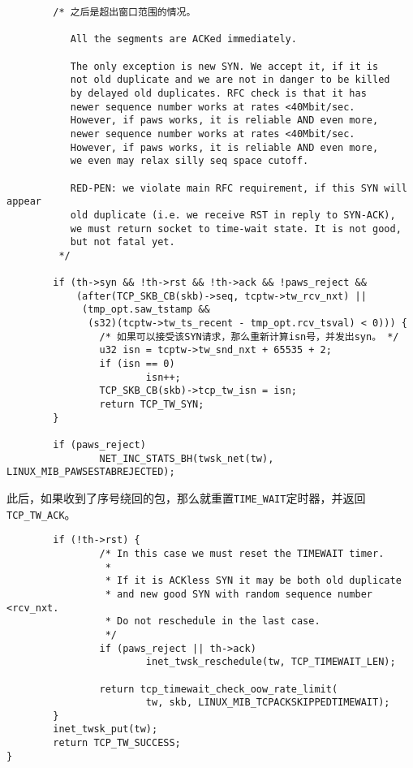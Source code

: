 \begin{verbatim}
        /* 之后是超出窗口范围的情况。

           All the segments are ACKed immediately.

           The only exception is new SYN. We accept it, if it is
           not old duplicate and we are not in danger to be killed
           by delayed old duplicates. RFC check is that it has
           newer sequence number works at rates <40Mbit/sec.
           However, if paws works, it is reliable AND even more,
           newer sequence number works at rates <40Mbit/sec.
           However, if paws works, it is reliable AND even more,
           we even may relax silly seq space cutoff.

           RED-PEN: we violate main RFC requirement, if this SYN will appear
           old duplicate (i.e. we receive RST in reply to SYN-ACK),
           we must return socket to time-wait state. It is not good,
           but not fatal yet.
         */

        if (th->syn && !th->rst && !th->ack && !paws_reject &&
            (after(TCP_SKB_CB(skb)->seq, tcptw->tw_rcv_nxt) ||
             (tmp_opt.saw_tstamp &&
              (s32)(tcptw->tw_ts_recent - tmp_opt.rcv_tsval) < 0))) {
                /* 如果可以接受该SYN请求，那么重新计算isn号，并发出syn。 */
                u32 isn = tcptw->tw_snd_nxt + 65535 + 2;
                if (isn == 0)
                        isn++;
                TCP_SKB_CB(skb)->tcp_tw_isn = isn;
                return TCP_TW_SYN;
        }

        if (paws_reject)
                NET_INC_STATS_BH(twsk_net(tw), LINUX_MIB_PAWSESTABREJECTED);
\end{verbatim}
此后，如果收到了序号绕回的包，那么就重置\texttt{TIME_WAIT}定时器，并返回
\texttt{TCP_TW_ACK}。
\begin{verbatim}
        if (!th->rst) {
                /* In this case we must reset the TIMEWAIT timer.
                 *
                 * If it is ACKless SYN it may be both old duplicate
                 * and new good SYN with random sequence number <rcv_nxt.
                 * Do not reschedule in the last case.
                 */
                if (paws_reject || th->ack)
                        inet_twsk_reschedule(tw, TCP_TIMEWAIT_LEN);

                return tcp_timewait_check_oow_rate_limit(
                        tw, skb, LINUX_MIB_TCPACKSKIPPEDTIMEWAIT);
        }
        inet_twsk_put(tw);
        return TCP_TW_SUCCESS;
}
\end{verbatim}

